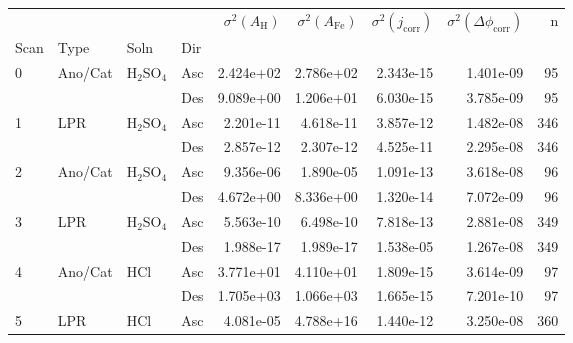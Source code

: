 \begin{tabular}{llllrrrrr}
\toprule
  &     &     &     &  $\sigma^2(A_{\text{H}})$ &  $\sigma^2(A_{\text{Fe}})$ &  $\sigma^2(j_{\text{corr}})$ &  $\sigma^2(\Delta \phi_{\text{corr}})$ &    n \\
Scan & Type & Soln & Dir &                           &                            &                              &                                        &      \\
\midrule
0 & Ano/Cat & H$_2$SO$_4$ & Asc &                 2.424e+02 &                  2.786e+02 &                    2.343e-15 &                              1.401e-09 &   95 \\
  &     &     & Des &                 9.089e+00 &                  1.206e+01 &                    6.030e-15 &                              3.785e-09 &   95 \\
1 & LPR & H$_2$SO$_4$ & Asc &                 2.201e-11 &                  4.618e-11 &                    3.857e-12 &                              1.482e-08 &  346 \\
  &     &     & Des &                 2.857e-12 &                  2.307e-12 &                    4.525e-11 &                              2.295e-08 &  346 \\
2 & Ano/Cat & H$_2$SO$_4$ & Asc &                 9.356e-06 &                  1.890e-05 &                    1.091e-13 &                              3.618e-08 &   96 \\
  &     &     & Des &                 4.672e+00 &                  8.336e+00 &                    1.320e-14 &                              7.072e-09 &   96 \\
3 & LPR & H$_2$SO$_4$ & Asc &                 5.563e-10 &                  6.498e-10 &                    7.818e-13 &                              2.881e-08 &  349 \\
  &     &     & Des &                 1.988e-17 &                  1.989e-17 &                    1.538e-05 &                              1.267e-08 &  349 \\
4 & Ano/Cat & HCl & Asc &                 3.771e+01 &                  4.110e+01 &                    1.809e-15 &                              3.614e-09 &   97 \\
  &     &     & Des &                 1.705e+03 &                  1.066e+03 &                    1.665e-15 &                              7.201e-10 &   97 \\
5 & LPR & HCl & Asc &                 4.081e-05 &                  4.788e+16 &                    1.440e-12 &                              3.250e-08 &  360 \\

\end{tabular}
